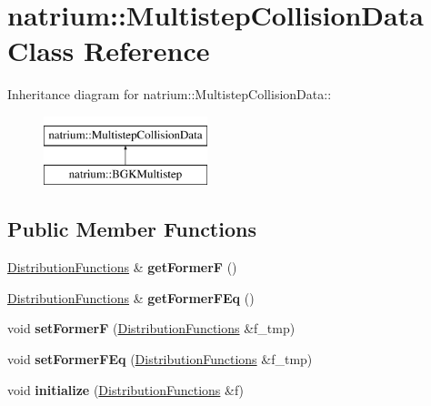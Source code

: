 \hypertarget{classnatrium_1_1MultistepCollisionData}{
\section{natrium::MultistepCollisionData Class Reference}
\label{classnatrium_1_1MultistepCollisionData}
}
Inheritance diagram for natrium::MultistepCollisionData::\begin{figure}[H]
\begin{center}
\leavevmode
\includegraphics[height=2cm]{classnatrium_1_1MultistepCollisionData}
\end{center}
\end{figure}
\subsection*{Public Member Functions}
\begin{DoxyCompactItemize}
\item 
\hypertarget{classnatrium_1_1MultistepCollisionData_af7ffd179454d924daff7c727d6f80813}{
\hyperlink{classnatrium_1_1DistributionFunctions}{DistributionFunctions} \& {\bfseries getFormerF} ()}
\label{classnatrium_1_1MultistepCollisionData_af7ffd179454d924daff7c727d6f80813}

\item 
\hypertarget{classnatrium_1_1MultistepCollisionData_aa7bb0df4ce5b0ea85f89da404e992a5a}{
\hyperlink{classnatrium_1_1DistributionFunctions}{DistributionFunctions} \& {\bfseries getFormerFEq} ()}
\label{classnatrium_1_1MultistepCollisionData_aa7bb0df4ce5b0ea85f89da404e992a5a}

\item 
\hypertarget{classnatrium_1_1MultistepCollisionData_ab3ceecc5a985a9f4b860f5b9734014e9}{
void {\bfseries setFormerF} (\hyperlink{classnatrium_1_1DistributionFunctions}{DistributionFunctions} \&f\_\-tmp)}
\label{classnatrium_1_1MultistepCollisionData_ab3ceecc5a985a9f4b860f5b9734014e9}

\item 
\hypertarget{classnatrium_1_1MultistepCollisionData_a41081e948026e884f38bcb6ac3f65a2f}{
void {\bfseries setFormerFEq} (\hyperlink{classnatrium_1_1DistributionFunctions}{DistributionFunctions} \&f\_\-tmp)}
\label{classnatrium_1_1MultistepCollisionData_a41081e948026e884f38bcb6ac3f65a2f}

\item 
\hypertarget{classnatrium_1_1MultistepCollisionData_afde2e8781805b3e157a6b546bd2d005b}{
void {\bfseries initialize} (\hyperlink{classnatrium_1_1DistributionFunctions}{DistributionFunctions} \&f)}
\label{classnatrium_1_1MultistepCollisionData_afde2e8781805b3e157a6b546bd2d005b}

\end{DoxyCompactItemize}
